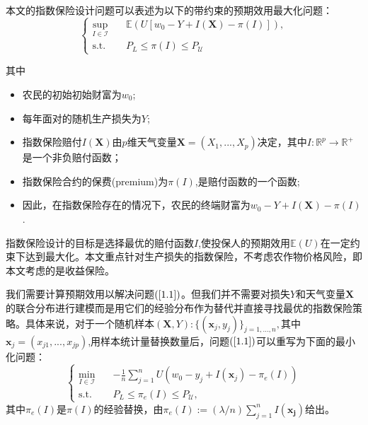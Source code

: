 \documentclass{beamer}
\begin{document}
\begin{frame}
    本文的指数保险设计问题可以表述为以下的带约束的预期效用最大化问题：
    \begin{equation}
        \left\{
        \begin{aligned}
            \sup_{I\in \mathcal{I}}\quad &\mathbb{E}(U[w_0-Y+I(\boldsymbol{X})-\pi(I)]),\\
            \text{s.t.}\quad &P_L\leq\pi(I)\leq P_\mathcal{U}
        \end{aligned}
        \right. \label{1.1}
    \end{equation}
\end{frame}
\begin{frame}
    其中
    \begin{itemize}
        \item 农民的初始初始财富为$w_0$;
        \item 每年面对的随机生产损失为$Y$;
        \item 指数保险赔付$I(\boldsymbol{X})$由$p$维天气变量$\boldsymbol{X}=(X_1,...,X_p)$决定，其中$I:\mathbb{R}^p\rightarrow\mathbb{R}^+$是一个非负赔付函数；
        \item 指数保险合约的保费(premium)为$\pi(I)$,是赔付函数的一个函数;
        \item 因此，在指数保险存在的情况下，农民的终端财富为$w_0-Y+I(\boldsymbol{X})-\pi(I)$.
    \end{itemize}
    指数保险设计的目标是选择最优的赔付函数$I$,使投保人的预期效用$\mathbb{E}(U)$在一定约束下达到最大化。本文重点针对生产损失的指数保险，不考虑农作物价格风险，即本文考虑的是收益保险。
\end{frame}
\begin{frame}
    我们需要计算预期效用以解决问题$(\ref{1.1})$。但我们并不需要对损失$Y$和天气变量$\boldsymbol{X}$的联合分布进行建模而是用它们的经验分布作为替代并直接寻找最优的指数保险策略。具体来说，对于一个随机样本$(\boldsymbol{X},Y):\{(\boldsymbol{x}_j,y_j)\}_{j=1,...,n},$其中$\boldsymbol{x}_j=(x_{j1},...,x_{jp})$,用样本统计量替换数量后，问题$(\ref{1.1})$可以重写为下面的最小化问题：
    \begin{equation}
        \left\{
        \begin{aligned}
        \min_{I\in\mathcal{I}}\quad&-\frac{1}{n}\sum_{j=1}^n U(w_0-y_j+I(\boldsymbol{x}_j)-\pi_e(I))\\
        \text{s.t.}\quad& P_L\leq \pi_e(I)\leq P_\mathcal{U},
        \end{aligned}
        \right.\label{1.2}
    \end{equation}
    其中$\pi_e(I)$是$\pi(I)$的经验替换，由$\pi_e(I):=(\lambda/n)\sum_{j=1}^nI(\boldsymbol{x_j})$给出。
\end{frame}
\end{document}
